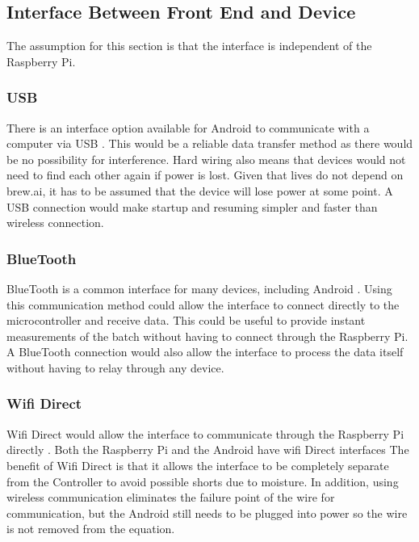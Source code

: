 \subsection{Interface Between Front End and Device}
The assumption for this section is that the interface is independent of the Raspberry Pi.

\subsubsection{USB}
There is an interface option available for Android to communicate with a computer via USB \cite{USB}.
This would be a reliable data transfer method as there would be no possibility for interference.
Hard wiring also means that devices would not need to find each other again if power is lost.
Given that lives do not depend on brew.ai, it has to be assumed that the device will lose power at some point.
A USB connection would make startup and resuming simpler and faster than wireless connection.


\subsubsection{BlueTooth}
BlueTooth is a common interface for many devices, including Android \cite{BlueTooth}.
Using this communication method could allow the interface to connect directly to the microcontroller and receive data.
This could be useful to provide instant measurements of the batch without having to connect through the Raspberry Pi.
A BlueTooth connection would also allow the interface to process the data itself without having to relay through any device.


\subsubsection{Wifi Direct}
Wifi Direct would allow the interface to communicate through the Raspberry Pi directly \cite{PiWifiDirect}.
Both the Raspberry Pi and the Android have wifi Direct interfaces \cite{AndroidWifiDirect}
The benefit of Wifi Direct is that it allows the interface to be completely separate from the Controller to avoid possible shorts due to moisture.
In addition, using wireless communication eliminates the failure point of the wire for communication, but the Android still needs to be plugged into power so the wire is not removed from the equation.

